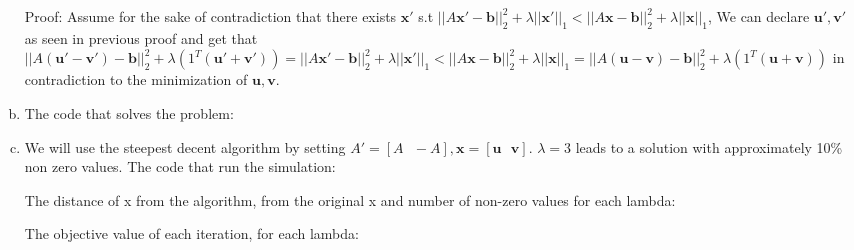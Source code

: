 \documentclass{article}
\begin{document}
\begin{enumerate}[(a)]
Proof: Assume for the sake of contradiction that there exists $\mathbf{x}'$ s.t
$||A\mathbf{x}' - \mathbf{b}||_2^2 + \lambda||\mathbf{x}'||_1 < ||A\mathbf{x} - \mathbf{b}||_2^2 + \lambda||\mathbf{x}||_1$, We can declare $\mathbf{u}', \mathbf{v}'$ as seen in previous proof and get that $||A(\mathbf{u}' - \mathbf{v}') - \mathbf{b}||_2^2 + \lambda(1^T(\mathbf{u}' + \mathbf{v}')) = ||A\mathbf{x}' - \mathbf{b}||_2^2 + \lambda||\mathbf{x}'||_1 < ||A\mathbf{x} - \mathbf{b}||_2^2 + \lambda||\mathbf{x}||_1 = ||A(\mathbf{u} - \mathbf{v}) - \mathbf{b}||_2^2 + \lambda(1^T(\mathbf{u} + \mathbf{v}))$ in contradiction to the minimization of $\mathbf{u}, \mathbf{v}.$

\item The code that solves the problem:
\begin{scriptsize}
\begin{tcolorbox}[%
    enhanced,
    breakable,
    frame hidden,
    overlay broken = {
        \draw[line width=0.5mm, black, rounded corners]
        (frame.north west) rectangle (frame.south east);},
    ]{}
%
\end{tcolorbox}
\end{scriptsize}
\item We will use the steepest decent algorithm by setting $A'=[A\text{ }-A], \mathbf{x} = [\mathbf{u}\text{ }\mathbf{v}]$. $\lambda=3$ leads to a solution with approximately 10\% non zero values. The code that run the simulation:
\begin{scriptsize}
\begin{tcolorbox}[%
    enhanced,
    breakable,
    frame hidden,
    overlay broken = {
        \draw[line width=0.5mm, black, rounded corners]
        (frame.north west) rectangle (frame.south east);},
    ]{}
%
\end{tcolorbox}
\end{scriptsize}
 The distance of x from the algorithm, from the original x and number of non-zero values for each lambda:
\begin{scriptsize}
\begin{tcolorbox}[%
    enhanced,
    breakable,
    frame hidden,
    overlay broken = {
        \draw[line width=0.5mm, black, rounded corners]
        (frame.north west) rectangle (frame.south east);},
    ]{}
\end{tcolorbox}
\end{scriptsize}
The objective value of each iteration, for each lambda:

\end{enumerate}
\end{document}
